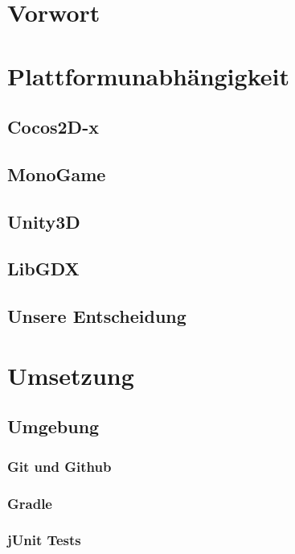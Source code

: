 \section{Vorwort}									\label{sec:A0}		\clearpage
\section{Plattformunabhängigkeit}					\label{sec:B1}		
	\subsection{Cocos2D-x}							\label{sec:B2}		
	\subsection{MonoGame}							\label{sec:B3}		
	\subsection{Unity3D}							\label{sec:B4}		
	\subsection{LibGDX}								\label{sec:B5}		
	\subsection{Unsere Entscheidung}				\label{sec:B6}		\clearpage
\section{Umsetzung}                                 \label{sec:C0}		
	\subsection{Umgebung}                           \label{sec:D0}		
		\subsubsection{Git und Github}				\label{sec:D1}		\clearpage
		\subsubsection{Gradle}						\label{sec:D2}		\clearpage
		\subsubsection{jUnit Tests}					\label{sec:D3}		\clearpage
